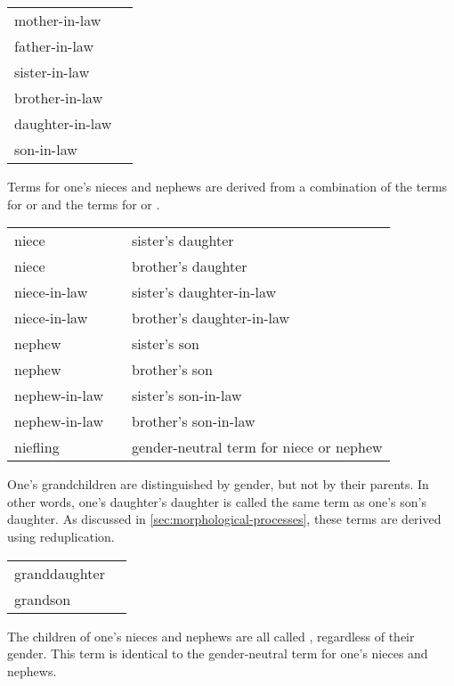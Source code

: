 \exdisplay\noexno
\begin{tabu} {l l}
	mother-in-law & \\
	father-in-law & \\
	sister-in-law & \\
	brother-in-law & \\
	daughter-in-law & \\
	son-in-law & \\
\end{tabu}
\xe

Terms for one's nieces and nephews are derived from a combination of the terms for  or  and the terms for  or .

\exdisplay\noexno
\begin{tabu} {l l l}
	niece &  & sister's daughter\\
	niece &  & brother's daughter\\
	niece-in-law &  & sister's daughter-in-law\\
	niece-in-law &  & brother's daughter-in-law\\
	nephew &  & sister's son\\
	nephew &  & brother's son\\
	nephew-in-law &  & sister's son-in-law\\
	nephew-in-law &  & brother's son-in-law\\
	niefling &  & gender-neutral term for niece or nephew\\
\end{tabu}
\xe

One's grandchildren are distinguished by gender, but not by their parents. In other words, one's daughter's daughter is called the same term as one's son's daughter. As discussed in \autoref{sec:morphological-processes}, these terms are derived using reduplication.

\exdisplay\noexno
\begin{tabu} {l l}
	granddaughter & \\
	grandson & \\
\end{tabu}
\xe

The children of one's nieces and nephews are all called , regardless of their gender. This term is identical to the gender-neutral term for one's nieces and nephews.

